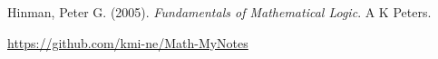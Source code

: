 \documentclass[autodetect-engine, ja=standard, base=10pt, b4j, english]{bxjsreport} %
\begin{document}
Hinman, Peter G. (2005). \textit{Fundamentals of Mathematical Logic}. A K Peters.

\url{https://github.com/kmi-ne/Math-MyNotes}


\end{document}
